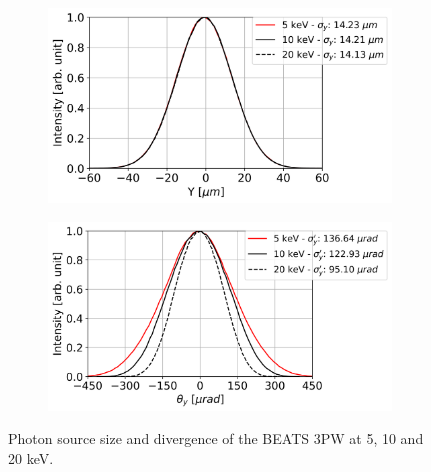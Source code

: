 \begin{figure}[ht]
\bigskip  %
\begin{subfigure}{0.5\textwidth}
\includegraphics[width=\linewidth]{./../../beam_snapshots/3PW/sigmaY.png}
\end{subfigure}
\hfill %
\begin{subfigure}{0.5\textwidth}
\includegraphics[width=\linewidth]{./../../beam_snapshots/3PW/sigmaYp.png}
\end{subfigure}
\caption{\label{fig:3PW_source} Photon source size and divergence of the BEATS 3PW at 5, 10 and 20 keV.}
\end{figure}

